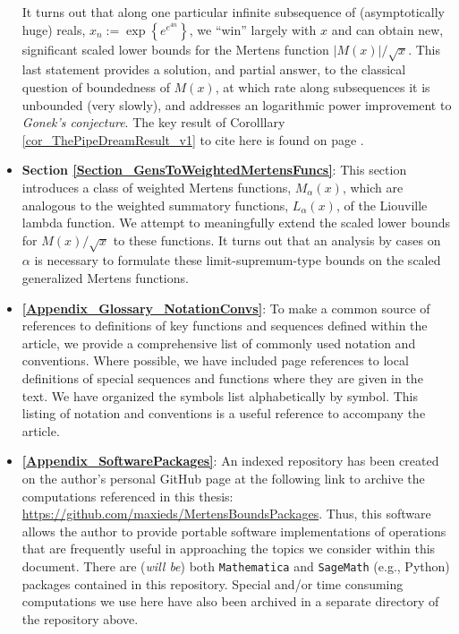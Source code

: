 \documentclass[11pt,reqno,a4letter]{article}
\numberwithin{figure}{section}
\numberwithin{table}{section}
\theoremstyle{plain}
\numberwithin{theorem}{section}
\theoremstyle{definition}
\begin{document}
\begin{itemize}
           It turns out that along one particular infinite subsequence of (asymptotically huge) reals, 
           $x_n := \exp\left\{e^{e^{4n}}\right\}$, we ``win'' largely with $x$ 
           and can obtain new, significant scaled lower bounds 
           for the Mertens function $|M(x)| / \sqrt{x}$. This last statement provides a solution, and 
           partial answer, to the classical 
           question of boundedness of $M(x)$, at which rate along subsequences it is unbounded (very slowly), 
           and addresses an logarithmic power improvement to \emph{Gonek's conjecture}. 
           The key result of Corolllary \ref{cor_ThePipeDreamResult_v1} to cite here is found on page 
           \pageref{cor_ThePipeDreamResult_v1}. 
     \item \textbf{Section \ref{Section_GensToWeightedMertensFuncs}}: 
           This section introduces a class of weighted Mertens functions, $M_{\alpha}(x)$, which are analogous 
           to the weighted summatory functions, $L_{\alpha}(x)$, of the Liouville lambda function. 
           We attempt to meaningfully extend the scaled lower bounds for $M(x) / \sqrt{x}$ to these 
           functions. It turns out that an analysis by cases on $\alpha$ is necessary to formulate these 
           limit-supremum-type bounds on the scaled generalized Mertens functions. 
     \item \textbf{\ref{Appendix_Glossary_NotationConvs}}: 
           To make a common source of references to definitions of key functions and sequences defined within the article, 
           we provide a comprehensive list of commonly used notation and conventions. 
           Where possible, we have included page references to local definitions of special 
           sequences and functions where they are given in the text. 
           We have organized the symbols list alphabetically by symbol. 
           This listing of notation and conventions is a useful reference to accompany the article. 
     \item \textbf{\ref{Appendix_SoftwarePackages}}: 
           An indexed repository has been created on the 
           author's personal GitHub page at the following link to archive the 
           computations referenced in this thesis: 
           \href{https://github.com/maxieds/MertensBoundsPackages}{\url{https://github.com/maxieds/MertensBoundsPackages}}. 
           Thus, this software allows the author to provide portable software implementations 
           of operations that are frequently useful in approaching the topics we consider within this 
           document. There are (\emph{will be}) both \texttt{Mathematica} and \texttt{SageMath} (e.g., Python) packages 
           contained in this repository. Special and/or time consuming computations we use here have also 
           been archived in a separate directory of the repository above. 
\end{itemize} 
\end{document}
